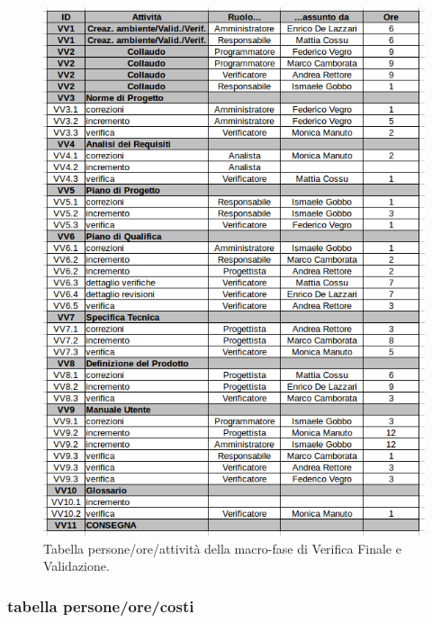 \begin{figure}[h]
\begin{center}
\includegraphics[scale=0.50]{img/verival-attivita.png}
\caption{Tabella persone/ore/attività della macro-fase di Verifica Finale e Validazione.}
\end{center}
\end{figure}
\clearpage

\subsubsection{tabella persone/ore/costi}

